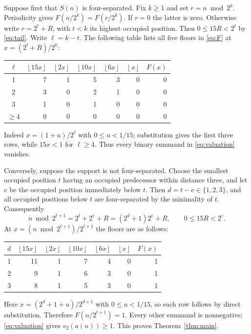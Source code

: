 \documentclass[11pt]{article}
\newcommand{\fl}[1]{\left\lfloor #1\right\rfloor}
\begin{document}
Suppose first that $S(n)$ is four-separated. Fix $k\geq1$ and set
$r=n\bmod2^k$. Periodicity gives $F(n/2^k)=F(r/2^k)$.
If $r=0$ the latter is zero. Otherwise write
$r=2^t+R$, with $t<k$ its highest occupied position.
Then $0\leq15R<2^t$ by \eqref{eq:tail}. Write $\ell=k-t$.
The following table lists all five floors in \eqref{eq:F} at
$x=(2^t+R)/2^k$:
\begin{center}
\begin{tabular}{c|rrrrr|r}
\toprule
$\ell$&$\fl{15x}$&$\fl{2x}$&$\fl{10x}$&$\fl{6x}$&$\fl{x}$&$F(x)$\\
\midrule
1&7&1&5&3&0&0\\
2&3&0&2&1&0&0\\
3&1&0&1&0&0&0\\
$\geq4$&0&0&0&0&0&0\\
\bottomrule
\end{tabular}
\end{center}
Indeed $x=(1+u)/2^\ell$ with $0\leq u<1/15$;
substitution gives the first three rows, while $15x<1$ for $\ell\geq4$.
Thus every binary summand in \eqref{eq:valuation} vanishes.

Conversely, suppose the support is not four-separated. Choose the smallest
occupied position $t$ having an occupied predecessor within distance three,
and let $e$ be the occupied position immediately below $t$.
Then $d=t-e\in\{1,2,3\}$, and all occupied positions below $t$
are four-separated by the minimality of $t$.
Consequently
\[
 n\bmod2^{t+1}=2^t+2^e+R=(2^d+1)2^e+R,
 \qquad 0\leq15R<2^e.
\]
At $x=(n\bmod2^{t+1})/2^{t+1}$ the floors are as follows:
\begin{center}
\begin{tabular}{c|rrrrr|r}
\toprule
$d$&$\fl{15x}$&$\fl{2x}$&$\fl{10x}$&$\fl{6x}$&$\fl{x}$&$F(x)$\\
\midrule
1&11&1&7&4&0&1\\
2&9&1&6&3&0&1\\
3&8&1&5&3&0&1\\
\bottomrule
\end{tabular}
\end{center}
Here $x=(2^d+1+u)/2^{d+1}$ with $0\leq u<1/15$, so each
row follows by direct substitution. Therefore
$F(n/2^{t+1})=1$. Every other summand is nonnegative;
\eqref{eq:valuation} gives $v_2(a(n))\geq1$.
This proves Theorem~\ref{thm:main}.
\end{document}
